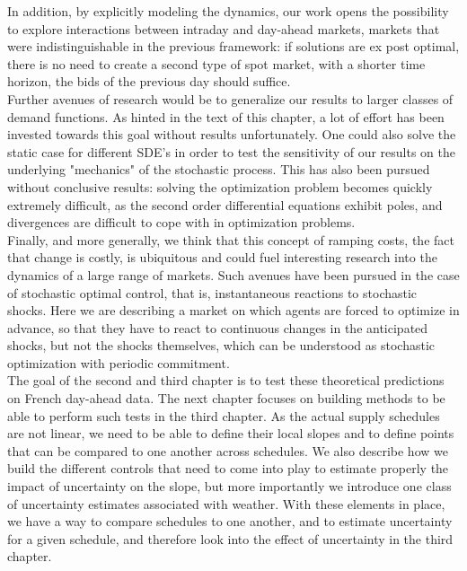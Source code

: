 In addition, by explicitly modeling the dynamics, our work opens the possibility to explore interactions between intraday and day-ahead markets, markets that were indistinguishable in the previous framework: if solutions are ex post optimal, there is no need to create a second type of spot market, with a shorter time horizon, the bids of the previous day should suffice. \\

Further avenues of research would be to generalize our results to larger classes of demand functions. As hinted in the text of this chapter, a lot of effort has been invested towards this goal without results unfortunately. One could also solve the static case for different SDE's in order to test the sensitivity of our results on the underlying "mechanics" of the stochastic process. This has also been pursued without conclusive results: solving the optimization problem becomes quickly extremely difficult, as the second order differential equations exhibit poles, and divergences are difficult to cope with in optimization problems.\\

Finally, and more generally, we think that this concept of ramping costs, the fact that change is costly, is ubiquitous and could fuel interesting research into the dynamics of a large range of markets. Such avenues have been pursued in the case of stochastic optimal control, that is, instantaneous reactions to stochastic shocks. Here we are describing a market on which agents are forced to optimize in advance, so that they have to react to continuous changes in the anticipated shocks, but not the shocks themselves, which can be understood as stochastic optimization with periodic commitment. \\

The goal of the second and third chapter is to test these theoretical predictions on French day-ahead data. The next chapter focuses on building methods to be able to perform such tests in the third chapter. As the actual supply schedules are not linear, we need to be able to define their local slopes and to define points that can be compared to one another across schedules. We also describe how we build the different controls that need to come into play to estimate properly the impact of uncertainty on the slope, but more importantly we introduce one class of uncertainty estimates associated with weather. With these elements in place, we have a way to compare schedules to one another, and to estimate uncertainty for a given schedule, and therefore look into the effect of uncertainty in the third chapter. 

